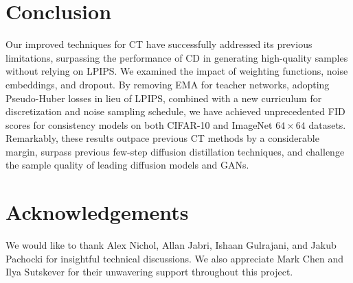 \section{Conclusion}
Our improved techniques for CT have successfully addressed its previous limitations, surpassing the performance of CD in generating high-quality samples without relying on LPIPS. We examined the impact of weighting functions, noise embeddings, and dropout. By removing EMA for teacher networks, adopting Pseudo-Huber losses in lieu of LPIPS, combined with a new curriculum for discretization and noise sampling schedule, we have achieved unprecedented FID scores for consistency models on both CIFAR-10 and ImageNet $64\times 64$ datasets. Remarkably, these results outpace previous CT methods by a considerable margin, surpass previous few-step diffusion distillation techniques, and challenge the sample quality of leading diffusion models and GANs.

\section*{Acknowledgements}
We would like to thank Alex Nichol, Allan Jabri, Ishaan Gulrajani, and Jakub Pachocki for insightful technical discussions. We also appreciate Mark Chen and Ilya Sutskever for their unwavering support throughout this project.







